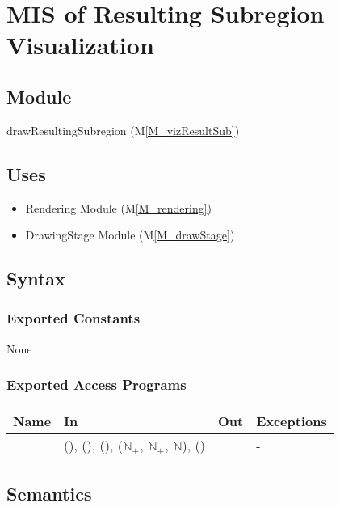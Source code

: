 \documentclass[12pt, titlepage]{article}
\newcommand{\mref}[1]{M\ref{#1}}
\newcommand{\mrefp}[1]{(\mref{#1})}
\newcommand{\mreff}[1]{Module \mrefp{#1}}
\begin{document}
\newpage



\section{MIS of Resulting Subregion Visualization} \label{MS_vizResultSub}

\subsection{Module}
drawResultingSubregion \mrefp{M_vizResultSub}

\subsection{Uses}
\begin{itemize}
  \item Rendering \mreff{M_rendering}
  \item DrawingStage \mreff{M_drawStage}
\end{itemize}

\subsection{Syntax}

\subsubsection{Exported Constants}
None
\subsubsection{Exported Access Programs}

\begin{center}
\begin{tabular}{L{5cm} L{4cm} L{4cm} L{2cm}}
\hline
\textbf{Name} & \textbf{In} & \textbf{Out} & \textbf{Exceptions} \\
\hline
{} &  (),
   (),
   (),
   ($\mathbb{N}_+$, $\mathbb{N}_+$, $\mathbb{N}$),
   ()
  &  & - \\
\hline
\end{tabular}
\end{center}

\subsection{Semantics}
\end{document}

